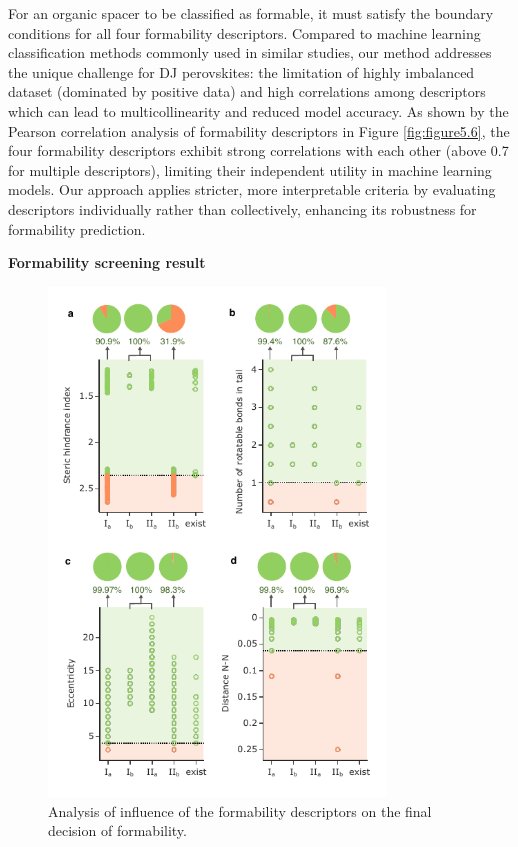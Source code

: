 For an organic spacer to be classified as formable, it must satisfy the boundary conditions for all four formability descriptors. Compared to machine learning classification methods commonly used in similar studies, our method addresses the unique challenge for DJ perovskites: the limitation of highly imbalanced dataset (dominated by positive data) and high correlations among descriptors which can lead to multicollinearity and reduced model accuracy. As shown by the Pearson correlation analysis of formability descriptors in Figure \ref{fig:figure5.6}, the four formability descriptors exhibit strong correlations with each other (above 0.7 for multiple descriptors), limiting their independent utility in machine learning models. Our approach applies stricter, more interpretable criteria by evaluating descriptors individually rather than collectively, enhancing its robustness for formability prediction.

\textbf{Formability screening result}

\begin{figure}[htbp]
    \centering
    \includegraphics[width=0.8\textwidth]{figures/synthesis-feasibility/figure5-7.pdf}
    \caption{Analysis of influence of the formability descriptors on the final decision of formability.}
    \label{fig:figure5.7}
\end{figure}

